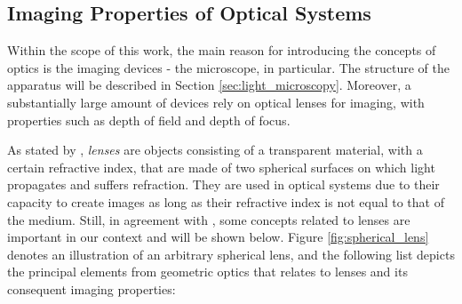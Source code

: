 \subsection{Imaging Properties of Optical Systems}

Within the scope of this work, the main reason for introducing the concepts of optics is the imaging devices - the microscope, in particular. The structure of the apparatus will be described in Section \ref{sec:light_microscopy}. Moreover, a substantially large amount of devices rely on optical lenses for imaging, with properties such as depth of field and depth of focus.

As stated by , \emph{lenses} are objects consisting of a transparent material, with a certain refractive index, that are made of two spherical surfaces on which light propagates and suffers refraction. They are used in optical systems due to their capacity to create images as long as their refractive index is not equal to that of the medium. Still, in agreement with , some concepts related to lenses are important in our context and will be shown below. Figure \ref{fig:spherical_lens} denotes an illustration of an arbitrary spherical lens, and the following list depicts the principal elements from geometric optics that relates to lenses and its consequent imaging properties:

